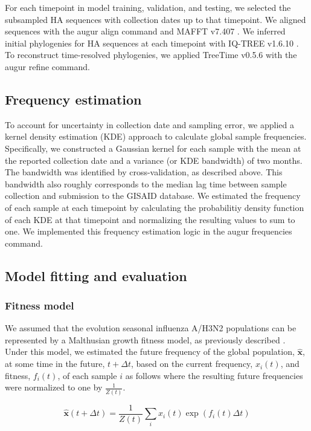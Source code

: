 For each timepoint in model training, validation, and testing, we selected the subsampled HA sequences with collection dates up to that timepoint.
We aligned sequences with the augur align command \cite{Hadfield2018} and MAFFT v7.407 \cite{Katoh2002}.
We inferred initial phylogenies for HA sequences at each timepoint with IQ-TREE v1.6.10 \cite{Nguyen2014}.
To reconstruct time-resolved phylogenies, we applied TreeTime v0.5.6 \cite{Sagulenko2018} with the augur refine command.

\subsection*{Frequency estimation}

To account for uncertainty in collection date and sampling error, we applied a kernel density estimation (KDE) approach to calculate global sample frequencies.
Specifically, we constructed a Gaussian kernel for each sample with the mean at the reported collection date and a variance (or KDE bandwidth) of two months.
The bandwidth was identified by cross-validation, as described above.
This bandwidth also roughly corresponds to the median lag time between sample collection and submission to the GISAID database.
We estimated the frequency of each sample at each timepoint by calculating the probabilitiy density function of each KDE at that timepoint and normalizing the resulting values to sum to one.
We implemented this frequency estimation logic in the augur frequencies command.

\subsection*{Model fitting and evaluation}

\subsubsection*{Fitness model}

We assumed that the evolution seasonal influenza A/H3N2 populations can be represented by a Malthusian growth fitness model, as previously described \cite{Luksza:2014hj}.
Under this model, we estimated the future frequency of the global population, $\mathbf{\hat{x}}$, at some time in the future, $t + \Delta{t}$, based on the current frequency, $x_{i}(t)$, and fitness, $f_{i}(t)$, of each sample $i$ as follows where the resulting future frequencies were normalized to one by $\frac{1}{Z(t)}$.

\begin{equation}
    \mathbf{\hat{x}}(t + \Delta{t}) = \frac{1}{Z(t)}\sum_{i}x_{i}(t)\exp(f_{i}(t)\Delta{t})
    \label{equation_exponential_growth_model}
\end{equation}


